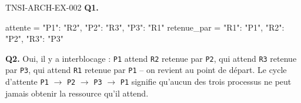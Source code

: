 \begin{corrige}{TNSI-ARCH-EX-002}
\textbf{Q1.}
\begin{python}
attente = {"P1": "R2", "P2": "R3", "P3": "R1"}
retenue_par = {"R1": "P1", "R2": "P2", "R3": "P3"}
\end{python}

\textbf{Q2.} Oui, il y a interblocage : \texttt{P1} attend \texttt{R2} retenue par \texttt{P2}, qui attend \texttt{R3} retenue par \texttt{P3}, qui attend \texttt{R1} retenue par \texttt{P1} -- on revient au point de départ. Le cycle d'attente \texttt{P1} $\to$ \texttt{P2} $\to$ \texttt{P3} $\to$ \texttt{P1} signifie qu'aucun des trois processus ne peut jamais obtenir la ressource qu'il attend.
\end{corrige}
